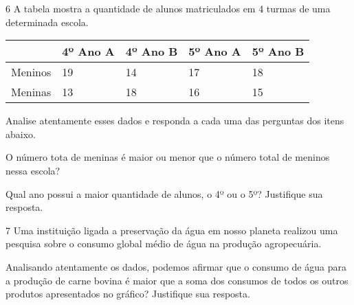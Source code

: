 
\num{6} A tabela mostra a quantidade de alunos matriculados em 4 turmas de
uma determinada escola.

\begin{longtable}[]{@{}lllll@{}}
\toprule
& 4º Ano A & 4º Ano B & 5º Ano A & 5º Ano B\tabularnewline
\midrule
\endhead
Meninos & 19 & 14 & 17 & 18\tabularnewline
Meninas & 13 & 18 & 16 & 15\tabularnewline
\bottomrule
\end{longtable}

Analise atentamente esses dados e responda a cada uma das perguntas dos
itens abaixo.

\begin{escolha}
\item
  O número tota de meninas é maior ou menor que o número total de
  meninos nessa escola?


\item
  Qual ano possui a maior quantidade de alunos, o 4º ou o 5º? Justifique
  sua resposta.

\end{escolha}


\num{7} Uma instituição ligada a preservação da água em nosso planeta
realizou uma pesquisa sobre o consumo global médio de água na produção
agropecuária.


Analisando atentamente os dados, podemos afirmar que o consumo de água
para a produção de carne bovina é maior que a soma dos consumos de todos
os outros produtos apresentados no gráfico? Justifique sua resposta.

